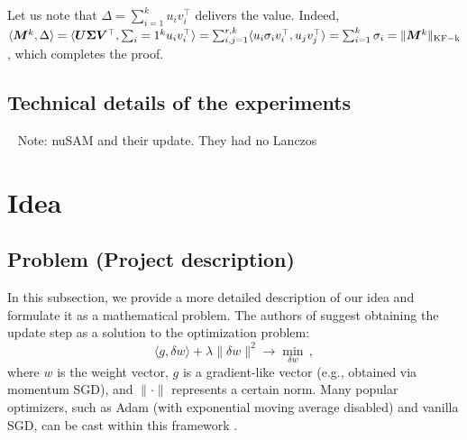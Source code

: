 \documentclass{article} %
\newcommand{\norm}[1]{\lVert #1\rVert}
\DeclarePairedDelimiter{\normkfk}{\|}{\|_\mathrm{KF-k}}
\def\<#1,#2>{\langle #1,#2\rangle}
\begin{document}
Let us note that $\Delta = \sum_{i=1}^{k} u_i v_i^\top$ delivers the value. Indeed, $\<\mM^k, \Delta> =\<\mU \mSigma \mV^\top, \sum_{i=1}^{k} u_i v_i^\top> = \sum_{i,j=1}^{r, k}\<u_i \sigma_i v_i^\top, u_j v_j^\top> = \sum_{i=1}^{k}\sigma_i = \normkfk{\mM^k}$, which completes the proof. 

\subsection{Technical details of the experiments}
~ Note: nuSAM and their update. They had no Lanczos

\iffalse

\section{Idea}

\subsection{Problem (Project description)}

In this subsection, we provide a more detailed description of our idea and formulate it as a mathematical problem. The authors of \cite{bernstein2024oldoptimizernewnorm} suggest obtaining the update step as a solution to the optimization problem:
\begin{equation}
    \langle g, \delta w \rangle + \lambda \norm{\delta w}^2 \to \min_{\delta w}\,,
\end{equation}
where $w$ is the weight vector, $g$ is a gradient-like vector (e.g., obtained via momentum SGD), and $\norm{\cdot}$ represents a certain norm. Many popular optimizers, such as Adam (with exponential moving average disabled) and vanilla SGD, can be cast within this framework \cite{bernstein2024oldoptimizernewnorm}.
\end{document}
